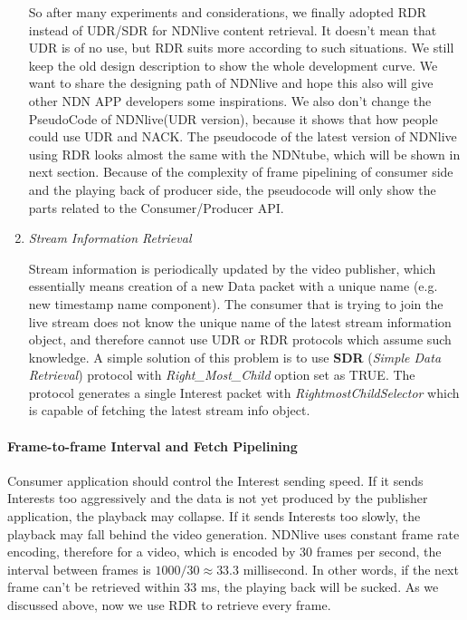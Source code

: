\begin{enumerate}
So after many experiments and considerations, we finally adopted RDR instead of UDR/SDR for NDNlive content retrieval. It doesn't mean that UDR is of no use, but RDR suits more according to such situations. We still keep the old design description to show the whole development curve. We want to share the designing path of NDNlive and hope this also will give other NDN APP developers some inspirations. We also don't change the PseudoCode of NDNlive(UDR version), because it shows that how people could use UDR and NACK. The pseudocode of the latest version of NDNlive using RDR looks almost the same with the NDNtube, which will be shown in next section. Because of the complexity of frame pipelining of consumer side and the playing back of producer side, the pseudocode will only show the parts related to the Consumer/Producer API.

	\item {\textit{Stream Information Retrieval}} 
	
Stream information is periodically updated by the video publisher, which essentially means creation of a new Data packet with a unique name (e.g. new timestamp name component). The consumer that is trying to join the live stream does not know the unique name of the latest stream information object, and therefore cannot use UDR or RDR protocols which assume such knowledge. A simple solution of this problem is to use  \textbf{SDR} (\textit{Simple Data Retrieval}) protocol with \textit{Right\_Most\_Child} option set as TRUE. The protocol generates a single Interest packet with \textit{RightmostChildSelector} which is capable of fetching the latest stream info object. 

\end{enumerate}
\vspace{-0.5cm}

\paragraph{Frame-to-frame Interval and Fetch Pipelining}
\vspace{0.1cm}
\label{par:consume_interval_pipelining}
Consumer application should control the Interest sending speed. If it sends Interests too aggressively and the data is not yet produced by the publisher application, the playback may collapse. If it sends Interests too slowly, the playback may fall behind the video generation. NDNlive uses constant frame rate encoding, therefore for a video, which is encoded by 30 frames per second, the interval between frames is $1000/30 \approx {33.3}$ millisecond. In other words, if the next frame can't be retrieved within 33 ms, the playing back will be sucked. As we discussed above, now we use RDR to retrieve every frame. 

